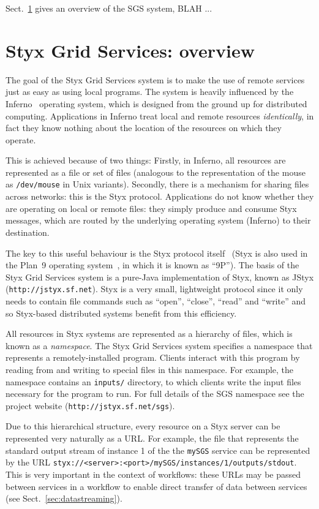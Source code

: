 \documentclass{llncs}
\begin{document}
Sect.~\ref{sec:sgsoverview} gives an overview of the SGS system, BLAH ...


\section{Styx Grid Services: overview}\label{sec:sgsoverview}
The goal of the Styx Grid Services system is to make the use of remote services just as easy as using local programs.  The system is heavily influenced by the Inferno~\cite{Inferno} operating system, which is designed from the ground up for distributed computing.  Applications in Inferno treat local and remote resources {\em identically\/}, in fact they know nothing about the location of the resources on which they operate.

This is achieved because of two things: Firstly, in Inferno, all resources are represented as a file or set of files (analogous to the representation of the mouse as {\tt /dev/mouse} in Unix variants).  Secondly, there is a mechanism for sharing files across networks: this is the Styx protocol.  Applications do not know whether they are operating on local or remote files: they simply produce and consume Styx messages, which are routed by the underlying operating system (Inferno) to their destination.

The key to this useful behaviour is the Styx protocol itself~\cite{Pike:1999} (Styx is also used in the Plan~9 operating system~\cite{Plan9}, in which it is known as ``9P'').  The basis of the Styx Grid Services system is a pure-Java implementation of Styx, known as JStyx ({\tt http://jstyx.sf.net}).  Styx is a very small, lightweight protocol since it only needs to contain file commands such as ``open'', ``close'', ``read'' and ``write'' and so Styx-based distributed systems benefit from this efficiency.

All resources in Styx systems are represented as a hierarchy of files, which is known as a {\em namespace\/}.  The Styx Grid Services system specifies a namespace that represents a remotely-installed program.  Clients interact with this program by reading from and writing to special files in this namespace.  For example, the namespace contains an {\tt inputs/} directory, to which clients write the input files necessary for the program to run.  For full details of the SGS namespace see the project website ({\tt http://jstyx.sf.net/sgs}).

Due to this hierarchical structure, every resource on a Styx server can be represented very naturally as a URL.  For example, the file that represents the standard output stream of instance 1 of the the {\tt mySGS} service can be represented by the URL {\tt styx://<server>:<port>/mySGS/instances/1/outputs/stdout}.  This is very important in the context of workflows: these URLs may be passed between services in a workflow to enable direct transfer of data between services (see Sect.~\ref{sec:datastreaming}).
\end{document}
